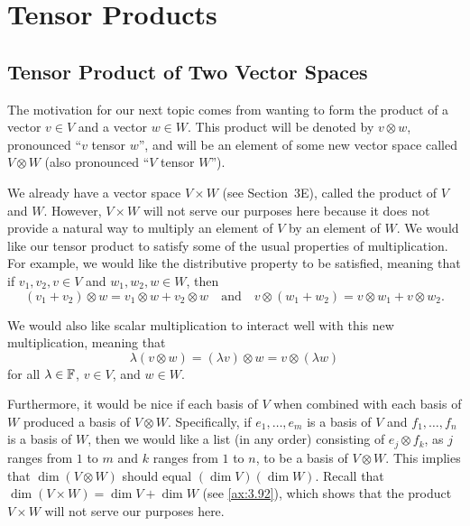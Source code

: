 \iftestbuild %
\setcounter{section}{3}\setcounter{theorem}{67}
\fi %
\DeclareRobustCommand\axeqstep[1]{\refstepcounter{theorem}\label{#1}}
\DeclareRobustCommand\axeqtag{\tag*{\thetheorem}}
\section{Tensor Products}

\subsection{Tensor Product of Two Vector Spaces}

The motivation for our next topic comes from wanting to form the product of a
vector $v\in V$ and a vector $w\in W$. This product will be denoted by
$v\otimes w$, pronounced ``$v$ tensor $w$'', and will be an element of some new
vector space called $V\otimes W$ (also pronounced ``$V$ tensor $W$'').

We already have a vector space $V\times W$ (see Section~3E), called the product
of $V$ and $W$. However, $V\times W$ will not serve our purposes here because it
does not provide a natural way to multiply an element of $V$ by an element of
$W$. We would like our tensor product to satisfy some of the usual properties
of multiplication. For example, we would like the distributive property to be
satisfied, meaning that if $v_1,v_2,v\in V$ and $w_1,w_2,w\in W$, then
\[ (v_1+v_2)\otimes w = v_1\otimes w+v_2\otimes w \quad\text{and}\quad
   v\otimes(w_1+w_2) = v\otimes w_1+v\otimes w_2. \]

%
We would also like scalar multiplication to interact well with this new
multiplication, meaning that
\[ \lambda(v\otimes w) = (\lambda v)\otimes w = v\otimes(\lambda w) \]
for all $\lambda\in\mathbb{F}$, $v\in V$, and $w\in W$.

Furthermore, it would be nice if each basis of $V$ when combined with each
basis of $W$ produced a basis of $V\otimes W$. Specifically, if
$e_1,\dots,e_m$ is a basis of $V$ and $f_1,\dots,f_n$ is a basis of $W$, then
we would like a list (in any order) consisting of $e_j\otimes f_k$, as $j$
ranges from $1$ to $m$ and $k$ ranges from $1$ to $n$, to be a basis of
$V\otimes W$. This implies that $\dim(V\otimes W)$ should equal
$(\dim V)(\dim W)$. Recall that $\dim(V\times W)=\dim V+\dim W$ (see
\ref{ax:3.92}), which shows that the product $V\times W$ will not serve our
purposes here.

